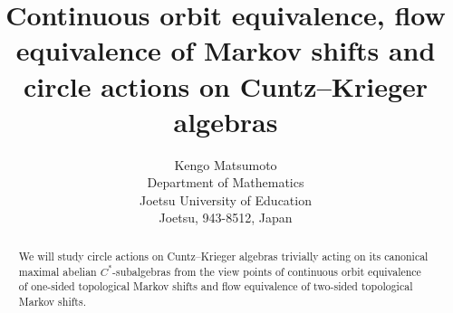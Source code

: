 \documentclass[11pt]{article}
\title{Continuous orbit equivalence,
flow equivalence  of Markov shifts 
and circle actions on Cuntz--Krieger algebras}
\author{Kengo Matsumoto \\
Department of Mathematics \\
Joetsu University of Education \\
Joetsu, 943-8512, Japan
}
\date{}
\theoremstyle{plain}
\theoremstyle{definition}
\numberwithin{equation}{section}
\newcommand{\Homeo}{\operatorname{Homeo}}
\newcommand{\id}{\operatorname{id}}
\newcommand{\Ker}{\operatorname{Ker}}
\newcommand{\Ad}{\operatorname{Ad}}
\def\det{{{\operatorname{det}}}}
\begin{document}
\maketitle

\def\det{{{\operatorname{det}}}}

\begin{abstract}
We will study circle actions 
on Cuntz--Krieger algebras 
trivially acting on its canonical maximal 
abelian $C^*$-subalgebras from the view points of 
continuous orbit equivalence of one-sided topological Markov shifts
and  
flow equivalence of two-sided topological Markov shifts.
\end{abstract}






\def\OA{{{\mathcal{O}}_A}}
\def\OB{{{\mathcal{O}}_B}}
\def\OZ{{{\mathcal{O}}_Z}}
\def\OTA{{{\mathcal{O}}_{\tilde{A}}}}
\def\SOA{{{\mathcal{O}}_A}\otimes{\mathcal{K}}}
\def\SOB{{{\mathcal{O}}_B}\otimes{\mathcal{K}}}
\def\SOZ{{{\mathcal{O}}_Z}\otimes{\mathcal{K}}}
\def\SOTA{{{\mathcal{O}}_{\tilde{A}}\otimes{\mathcal{K}}}}
\def\DA{{{\mathcal{D}}_A}}
\def\DB{{{\mathcal{D}}_B}}
\def\DZ{{{\mathcal{D}}_Z}}
\def\DTA{{{\mathcal{D}}_{\tilde{A}}}}
\def\SDA{{{\mathcal{D}}_A}\otimes{\mathcal{C}}}
\def\SDB{{{\mathcal{D}}_B}\otimes{\mathcal{C}}}
\def\SDZ{{{\mathcal{D}}_Z}\otimes{\mathcal{C}}}
\def\SDTA{{{\mathcal{D}}_{\tilde{A}}\otimes{\mathcal{C}}}}
\def\Max{{{\operatorname{Max}}}}
\def\Per{{{\operatorname{Per}}}}
\def\PerB{{{\operatorname{PerB}}}}
\def\Homeo{{{\operatorname{Homeo}}}}
\def\HA{{{\frak H}_A}}
\def\HB{{{\frak H}_B}}
\def\HSA{{H_{\sigma_A}(X_A)}}
\def\Out{{{\operatorname{Out}}}}
\def\Aut{{{\operatorname{Aut}}}}
\def\Ad{{{\operatorname{Ad}}}}
\def\Inn{{{\operatorname{Inn}}}}
\def\det{{{\operatorname{det}}}}
\def\exp{{{\operatorname{exp}}}}
\def\cobdy{{{\operatorname{cobdy}}}}
\def\Ker{{{\operatorname{Ker}}}}
\def\ind{{{\operatorname{ind}}}}
\def\id{{{\operatorname{id}}}}
\def\supp{{{\operatorname{supp}}}}
\def\co{{{\operatorname{co}}}}
\def\Sco{{{\operatorname{Sco}}}}
\def\ActA{{{\operatorname{Act}_{\DA}(\mathbb{R}/{\mathbb{Z}},\OA)}}}
\def\ActB{{{\operatorname{Act}_{\DB}(\mathbb{R}/{\mathbb{Z}},\OB)}}}
\def\RepOA{{{\operatorname{Rep}(\mathbb{R}/{\mathbb{Z}},\OA)}}}
\def\RepDA{{{\operatorname{Rep}(\mathbb{R}/{\mathbb{Z}},\DA)}}}
\def\RepDB{{{\operatorname{Rep}(\mathbb{R}/{\mathbb{Z}},\DB)}}}
\def\U{{{\mathcal{U}}}}
\end{document}

